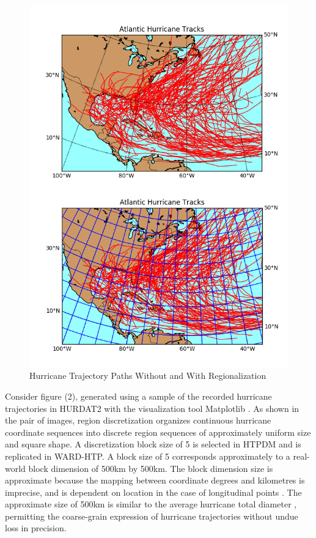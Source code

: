 \documentclass[12pt,conference]{IEEEtran}
\begin{document}
\begin{figure}[htp]
\caption{Hurricane Trajectory Paths Without and With Regionalization}
\centering
\includegraphics[scale=0.55]{Merged-Trajectory-Comparison}
\end{figure}

Consider figure (2), generated using a sample of the recorded hurricane trajectories in HURDAT2 with the visualization tool Matplotlib \cite{matplotlib}. As shown in the pair of images, region discretization organizes continuous hurricane coordinate sequences into discrete region sequences of approximately uniform size and square shape. A discretization block size of 5 is selected in HTPDM and is replicated in WARD-HTP. A block size of 5 corresponds approximately to a real-world block dimension of 500km by 500km. The block dimension size is approximate because the mapping between coordinate degrees and kilometres is imprecise, and is dependent on location in the case of longitudinal points \cite{lat-long-distance}. The approximate size of 500km is similar to the average hurricane total diameter \cite{hurricane-distances}, permitting the coarse-grain expression of hurricane trajectories without undue loss in precision.
\end{document}
